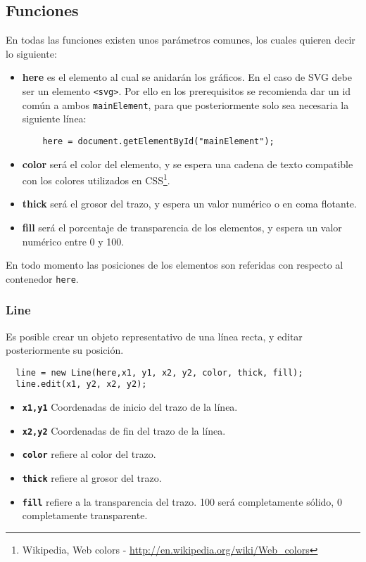 \newpage
\subsection{Funciones} %
\label{sub:funciones}

En todas las funciones existen unos parámetros comunes, los cuales quieren decir lo siguiente:

\begin{itemize}
  \item \textbf{here} es el elemento al cual se anidarán los gráficos. En el caso de SVG debe ser un elemento \texttt{<svg>}. Por ello en los prerequisitos se recomienda dar un id común a ambos \texttt{mainElement}, para que posteriormente solo sea necesaria la siguiente línea:
  \begin{verbatim}
    here = document.getElementById("mainElement");
  \end{verbatim}
  \item \textbf{color} será el color del elemento, y se espera una cadena de texto compatible con los colores utilizados en CSS\footnote{Wikipedia, Web colors - \url{http://en.wikipedia.org/wiki/Web_colors}}.
  \item \textbf{thick} será el grosor del trazo, y espera un valor numérico o en coma flotante.
  \item \textbf{fill} será el porcentaje de transparencia de los elementos, y espera un valor numérico entre 0 y 100.
\end{itemize}

En todo momento las posiciones de los elementos son referidas con respecto al contenedor \texttt{here}.

\subsubsection{Line} %
\label{ssub:line}

Es posible crear un objeto representativo de una línea recta, y editar posteriormente su posición.

\begin{verbatim}
  line = new Line(here,x1, y1, x2, y2, color, thick, fill);
  line.edit(x1, y2, x2, y2);
\end{verbatim}

\begin{itemize}
  \item \textbf{\texttt{x1,y1}} Coordenadas de inicio del trazo de la línea.
  \item \textbf{\texttt{x2,y2}} Coordenadas de fin del trazo de la línea.
  \item \textbf{\texttt{color}} refiere al color del trazo.
  \item \textbf{\texttt{thick}} refiere al grosor del trazo.
  \item \textbf{\texttt{fill}} refiere a la transparencia del trazo. 100 será completamente sólido, 0 completamente transparente.
\end{itemize}


